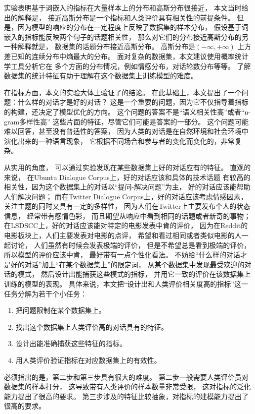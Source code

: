 实验表明基于词嵌入的指标在大量样本上的分布和高斯分布很接近，
本文当时给出的解释是，
接近高斯分布是一个指标和人类评价具有相关性的前提条件。
但是，因为模型的响应的分布在一定程度上反映了数据集的样本分布，
假设基于词嵌入的指标能反映两个句子的话题相关性，
那么对它们的分布接近高斯分布的另一种解释就是，
数据集的话题分布接近高斯分布。
高斯分布是$(-\infty, +\infty)$
上方差已知的连续分布中熵最大的分布。
面对复杂的数据集，本文建议使用概率统计学工具分析它在
多个方面的分布情况，例如情感分布，对话轮数分布等等。
了解数据集的统计特征有助于理解在这个数据集上训练模型的难度。

在指标方面，本文的实验大体上验证了的结论。
在此基础上，本文提出了一个问题：什么样的对话才是好的对话？
这是一个重要的问题，因为它不仅指导着指标的构建，还决定了模型优化的方向。
这个问题的答案不是“语义相关性高”或者“n-gram多样性高”
这些片面的特征，尽管它们可能是答案的一部分。
这个问题可能难以回答，甚至没有普适性的答案，
因为人类的对话是在自然环境和社会环境中演化出来的一种语言现象，
它根据不同场合和参与者的变化而变化的，非常复杂。

从实用的角度，
可以通过实验发现在某些数据集上好的对话应有的特征。
直观的来说，
在Ubuntu Dialogue Corpus上，好的对话应该和具体的技术话题
有较高的相关性，因为这个数据集上的对话以“提问-解决问题”为主，
好的对话应该能帮助人们解决问题；
而在Twitter Dialogue Corpus上，好的对话应该考虑情感因素，
关注主题的同时又具有一定的多样性，
因为人们在Twitter上主要发布个人的状态信息，
经常带有感情色彩，
而且期望从响应中看到相同的话题或者新奇的事物；
在LSDSCC上，好的对话应该能对特定的电影发表中肯的评价，
因为在Reddit的电影板块上，人们主要发表对电影的点评，
希望和看过相同或者类似电影的人一起讨论，
人们虽然有时候会发表极端的评价，
但是不希望总是看到极端的评价，
所以模型的评价应该中肯，
最好带有一点个性化看法。
不妨给“什么样的对话才是好的对话”加上“在某个数据集上”的限定词，
从某个数据集中发现最受欢迎的对话的模式，
然后设计出能捕获这些模式的指标，
并用它一致的评价在该数据集上训练的模型的表现。
具体来说，本文把“设计出和人类评价相关度高的指标”这一任务分解为若干个小任务：
\begin{enumerate}
    \item 把问题限制在某个数据集上。
    \item 找出这个数据集上人类评价高的对话具有的特征。
    \item 设计出能准确捕获这些特征的指标。
    \item 用人类评价验证指标在对应数据集上的有效性。
\end{enumerate}

必须指出的是，第二步和第三步具有很大的难度。
第二步一般需要人类评价员对数据集的样本打分，
这导致带有人类评价的样本数量非常受限，
这对指标的泛化能力提出了很高的要求。
第三步涉及的特征比较抽象，对指标的建模能力提出了很高的要求。

